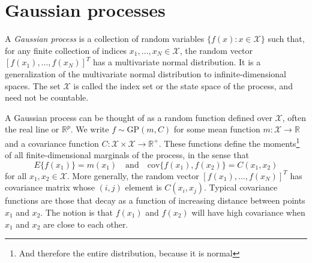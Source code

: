 \documentclass{homework}
\newcommand{\1}{\mathbf{1}}
\begin{document}
\section{Gaussian processes}

A \textit{Gaussian process} is a collection of random variables $\{f(x): x \in \mathcal{X}\}$ such that, for any finite collection of indices $x_1, \ldots, x_N \in \mathcal{X}$, the random vector $[f(x_1), \ldots, f(x_N)]^T$ has a multivariate normal distribution.  It is a generalization of the multivariate normal distribution to infinite-dimensional spaces. The set $\mathcal{X}$ is called the index set or the state space of the process, and need not be countable.

A Gaussian process can be thought of as a random function defined over $\mathcal{X}$, often the real line or $\mathbb{R}^p$.  We write $f \sim \mbox{GP}(m, C)$ for some mean function $m: \mathcal{X} \rightarrow \mathbb{R}$ and a covariance function $C: \mathcal{X} \times \mathcal{X} \rightarrow \mathbb{R}^+$.  These functions define the moments\footnote{And therefore the entire distribution, because it is normal} of all finite-dimensional marginals of the process, in the sense that
$$
E\{ f(x_1) \} = m(x_1) \quad \mbox{and} \quad \mbox{cov}\{f(x_1), f(x_2) \} = C(x_1, x_2)
$$
for all $x_1, x_2 \in \mathcal{X}$.  More generally, the random vector $[f(x_1), \ldots, f(x_N)]^T$ has covariance matrix whose $(i,j)$ element is $C(x_i, x_j)$.  Typical covariance functions are those that decay as a function of increasing distance between points $x_1$ and $x_2$.  The notion is that $f(x_1)$ and $f(x_2)$ will have high covariance when $x_1$ and $x_2$ are close to each other.
\end{document}
